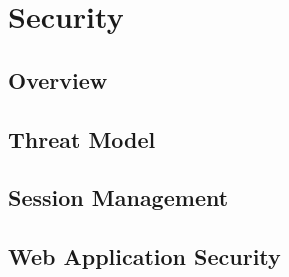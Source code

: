 \section{Security}																	
\label{sec:Security}

\subsection{Overview} 

\subsection{Threat Model}

\subsection{Session Management}

\subsection{Web Application Security}
